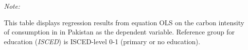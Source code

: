 \begin{table}[htbp!]
\begin{adjustbox}{width = 1\textwidth, max height = 0.95\textheight, center}
\begin{threeparttable}[b]
         \begin{tablenotes}\item \medskip \textit{Note:}
            \item This table displays regression results from equation OLS on the carbon intensity of consumption in  in Pakistan as the dependent variable. Reference group for education (\textit{ISCED}) is ISCED-level 0-1 (primary or no education).
         \end{tablenotes}
      \end{threeparttable}
   \end{adjustbox}
\end{table}


